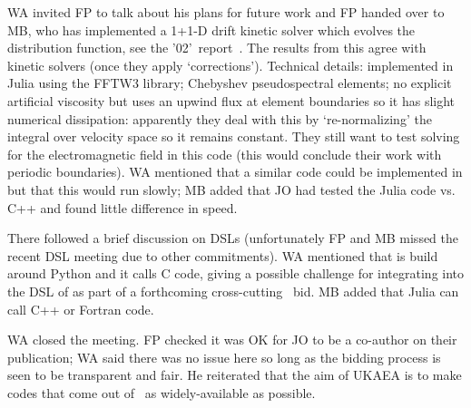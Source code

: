 WA invited FP to talk about his plans for future work and FP handed over to MB, 
who has implemented a 1+1-D drift kinetic solver which evolves the distribution 
function, see the '02'~report~\cite{2047357-TN-02}.  The results from this agree with kinetic solvers (once they apply 
`corrections').  Technical details: implemented in Julia using the FFTW3
library; Chebyshev pseudospectral elements; no explicit artificial viscosity 
but uses an upwind flux at element boundaries so it has slight numerical 
dissipation: apparently they deal with this by `re-normalizing' the integral 
over velocity space so it remains constant.  They still want to test solving 
for the electromagnetic field in this code (this would conclude their work with 
periodic boundaries).  WA mentioned that a similar code could be implemented in 
 but that this would run slowly; MB added that JO had tested the 
Julia code vs. C++ and found little difference in speed.

There followed a brief discussion on DSLs (unfortunately FP and MB missed the 
recent DSL meeting due to other commitments).  WA mentioned that  
is build around Python and it calls C code, giving a possible challenge for 
integrating  into the DSL of  as part of a forthcoming 
cross-cutting \exc\  bid.  MB added that Julia can call C++ or Fortran code.

WA closed the meeting.  FP checked it was OK for JO to be a co-author on their 
publication; WA said there was no issue here so long as the bidding process is 
seen to be transparent and fair.  He reiterated that the aim of UKAEA is to make codes that come 
out of \nep\  as widely-available as possible.

